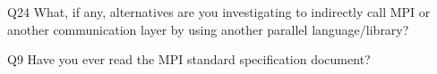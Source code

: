 \begin{description}%
\item{Q24} What, if any, alternatives are you investigating to indirectly call MPI or another communication layer by using another parallel language/library?%
\item{Q9} Have you ever read the MPI standard specification document?%
\end{description}%
